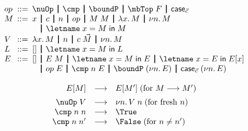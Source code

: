 \documentclass[natbib]{sigplanconf}
\begin{document}
\begin{figure}
\centering
\begin{small}
\begin{math}
\begin{array}{@{}c@{}}

\begin{array}{@{}l@{\hspace{5pt}}c@{\hspace{5pt}}l@{}}
\op & ::= & \nuOp \bor \cmp \bor \boundP \bor \mbTop\;F \bor \case
\\

M & ::= & x
\begin{array}[t]{@{}l@{}}
\bor c \bor n \bor \op \bor M\;M \bor \lamabsnot{x}{M} \bor \nuabs{n}{M}\\
\bor \lete{x}{M}{M}
\end{array}
\\

V & ::= & \lamabsnot{x}{M} \bor n \bor c\;\vec{M} \bor \nuabs{n}{M}
\\

L & ::= & [] \bor \lete{x}{M}{L}
\\

E & ::= & []
\begin{array}[t]{@{}l@{}}
\bor E\;M \bor \lete{x}{M}{E} \bor \lete{x}{E}{\tctxt{E}{x}}\\
\bor \op\;E \bor \cmp\;n\;E \bor \boundP\;(\nuabs{n}{E}) \bor \case\;(\nuabs{n}{E})
\end{array}

\end{array}

\\ \\

\begin{array}{@{}rcl@{}}

\tctxt{E}{M} & \rrto & \tctxt{E}{M'}\;\text{(for $M\rrto M'$)}

\\[5pt]

\nuOp\;V & \rrto & \nuabs{n}{V\;n}\;\text{(for fresh $n$)}\\

\cmp\;n\;n & \rrto & \True\\

\cmp\;n\;n' & \rrto & \False\;\text{(for $n\not=n'$)}\\


\end{array}
\end{array}
\end{math}
\end{small}
\end{figure}
\end{document}
